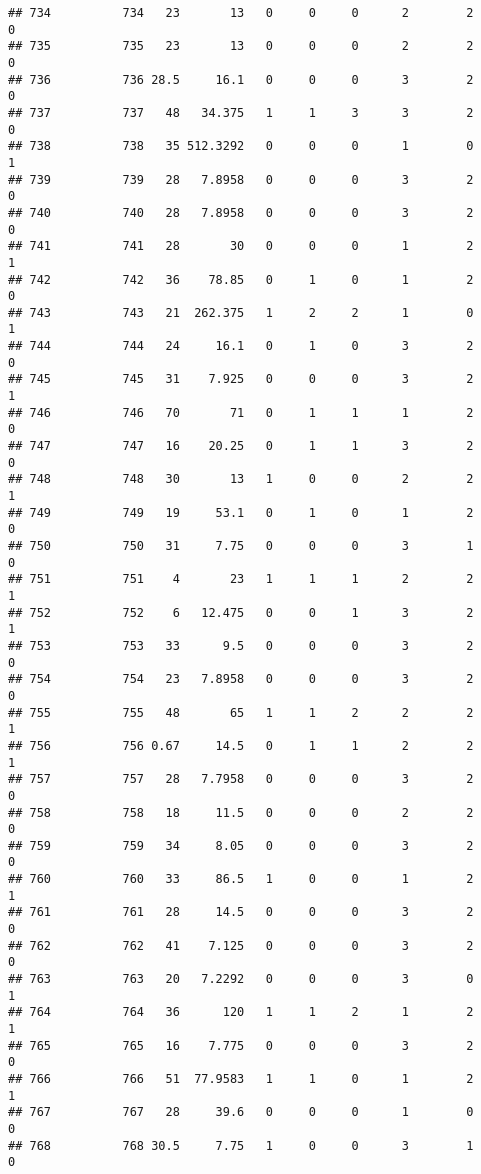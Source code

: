 \documentclass[
]{article}
\begin{document}
\begin{verbatim}
## 734          734   23       13   0     0     0      2        2         0
## 735          735   23       13   0     0     0      2        2         0
## 736          736 28.5     16.1   0     0     0      3        2         0
## 737          737   48   34.375   1     1     3      3        2         0
## 738          738   35 512.3292   0     0     0      1        0         1
## 739          739   28   7.8958   0     0     0      3        2         0
## 740          740   28   7.8958   0     0     0      3        2         0
## 741          741   28       30   0     0     0      1        2         1
## 742          742   36    78.85   0     1     0      1        2         0
## 743          743   21  262.375   1     2     2      1        0         1
## 744          744   24     16.1   0     1     0      3        2         0
## 745          745   31    7.925   0     0     0      3        2         1
## 746          746   70       71   0     1     1      1        2         0
## 747          747   16    20.25   0     1     1      3        2         0
## 748          748   30       13   1     0     0      2        2         1
## 749          749   19     53.1   0     1     0      1        2         0
## 750          750   31     7.75   0     0     0      3        1         0
## 751          751    4       23   1     1     1      2        2         1
## 752          752    6   12.475   0     0     1      3        2         1
## 753          753   33      9.5   0     0     0      3        2         0
## 754          754   23   7.8958   0     0     0      3        2         0
## 755          755   48       65   1     1     2      2        2         1
## 756          756 0.67     14.5   0     1     1      2        2         1
## 757          757   28   7.7958   0     0     0      3        2         0
## 758          758   18     11.5   0     0     0      2        2         0
## 759          759   34     8.05   0     0     0      3        2         0
## 760          760   33     86.5   1     0     0      1        2         1
## 761          761   28     14.5   0     0     0      3        2         0
## 762          762   41    7.125   0     0     0      3        2         0
## 763          763   20   7.2292   0     0     0      3        0         1
## 764          764   36      120   1     1     2      1        2         1
## 765          765   16    7.775   0     0     0      3        2         0
## 766          766   51  77.9583   1     1     0      1        2         1
## 767          767   28     39.6   0     0     0      1        0         0
## 768          768 30.5     7.75   1     0     0      3        1         0

\end{verbatim}
\end{document}
